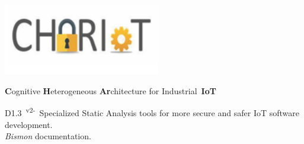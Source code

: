 \documentclass[11pt,a4paper,svgnames]{article}
\date{\bmdocdate}
\begin{document}



\pagestyle{fancy}
\fancyhf{}
\renewcommand{\footrulewidth}{0.4pt}
\futurelet\TMPfootrule\def\footrule{{\color{orange}\TMPfootrule}}
\futurelet\TMPheadrule\def\headrule{{\color{orange}\TMPheadrule}}
\begin{titlepage}

  \thispagestyle{empty}

  \begin{center}
    
    \includegraphics[width=194pt]{images/CHARIOT-logo}

    {\large \textbf{C}ognitive \textbf{H}eterogeneous  \textbf{Ar}chitecture for
Industrial~\textbf{IoT}}
    
    {\color{orange}\Huge {D1.3~\textsuperscript{v2-}~Specialized Static Analysis tools for more secure and safer IoT software development.}\\
    {\Large \emph{Bismon} documentation.}}

  
\begin{relsize}{-0.1}

\end{relsize}
\end{center}
\end{titlepage}
\end{document}
